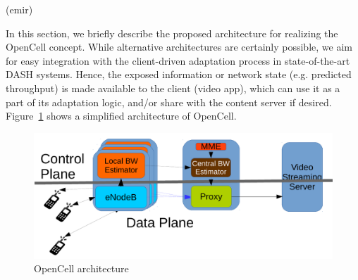 (emir)

In this section, we briefly describe the proposed architecture for realizing the OpenCell concept. While alternative architectures are certainly possible, we aim for easy integration with the client-driven adaptation process in state-of-the-art DASH systems. Hence, the exposed information or network state (e.g. predicted throughput) is made available to the client (video app), which can use it as a part of its adaptation logic, and/or share with the content server if desired. Figure~\ref{fig:Architecture} shows a simplified architecture of OpenCell.

\begin{figure}[tb]\label{fig:Architecture}
 \includegraphics[width=\linewidth]{pictures/architecture2.pdf}
 \caption{OpenCell architecture}
\end{figure}

